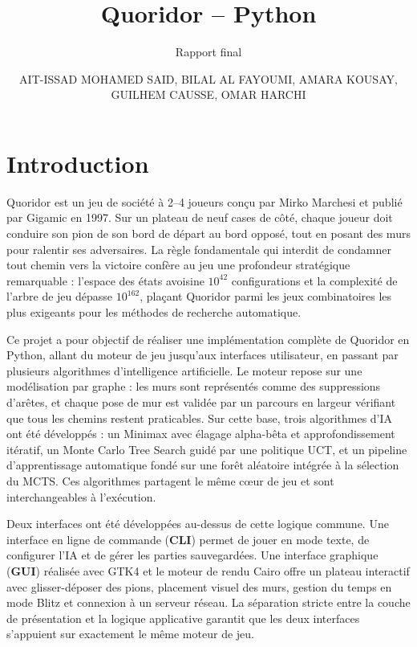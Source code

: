 \documentclass[a4paper]{article}
\title{Quoridor -- Python}
\subtitle{Rapport final}
\author{AIT-ISSAD MOHAMED SAID, BILAL AL FAYOUMI, AMARA KOUSAY, GUILHEM CAUSSE, OMAR HARCHI}
\begin{document}

\maketitle
\thispagestyle{empty}


\section*{Introduction}

Quoridor est un jeu de société à 2--4 joueurs conçu par Mirko Marchesi
et publié par Gigamic en 1997. Sur un plateau de neuf cases de côté, chaque
joueur doit conduire son pion de son bord de départ au bord opposé, tout en
posant des murs pour ralentir ses adversaires. La règle fondamentale qui interdit
de condamner tout chemin vers la victoire confère au jeu une profondeur
stratégique remarquable : l'espace des états avoisine $10^{42}$ configurations
et la complexité de l'arbre de jeu dépasse $10^{162}$, plaçant Quoridor parmi
les jeux combinatoires les plus exigeants pour les méthodes de recherche
automatique.

Ce projet a pour objectif de réaliser une implémentation complète de Quoridor en
Python, allant du moteur de jeu jusqu'aux interfaces utilisateur, en passant par
plusieurs algorithmes d'intelligence artificielle. Le moteur repose sur une
modélisation par graphe : les murs sont représentés comme des suppressions
d'arêtes, et chaque pose de mur est validée par un parcours en largeur vérifiant
que tous les chemins restent praticables. Sur cette base, trois algorithmes d'IA
ont été développés : un Minimax avec élagage alpha-bêta et approfondissement
itératif, un Monte Carlo Tree Search guidé par une politique UCT, et un pipeline
d'apprentissage automatique fondé sur une forêt aléatoire intégrée à la
sélection du MCTS. Ces algorithmes partagent le même cœur de jeu et sont
interchangeables à l'exécution.

Deux interfaces ont été développées au-dessus de cette logique commune. Une
interface en ligne de commande (\textbf{CLI}) permet de jouer en mode texte, de
configurer l'IA et de gérer les parties sauvegardées. Une interface graphique
(\textbf{GUI}) réalisée avec GTK4 et le moteur de rendu Cairo offre un plateau
interactif avec glisser-déposer des pions, placement visuel des murs, gestion du
temps en mode Blitz et connexion à un serveur réseau. La séparation stricte
entre la couche de présentation et la logique applicative garantit que les deux
interfaces s'appuient sur exactement le même moteur de jeu.
\end{document}
